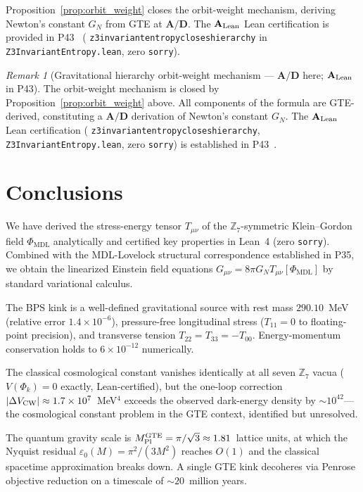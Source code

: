 \documentclass[11pt]{article}
\theoremstyle{remark}
\newtheorem{remark}[theorem]{Remark}
\newcommand{\GTE}{\text{GTE}}
\newcommand{\PHIMDL}{\Phi_{\mathrm{MDL}}}
\newcommand{\ZS}{\mathbb{Z}_7}
\newcommand{\lean}[1]{%
  \penalty-100
  \begingroup\def\_{\textunderscore\allowbreak}\texttt{#1}\endgroup}
\newcommand{\epsz}{\varepsilon_0}
\newcommand{\CatAL}{\ensuremath{\textbf{A}_{\rm Lean}}}
\newcommand{\CatAD}{\textbf{A/D}}
\newcommand{\Tmunu}{T_{\mu\nu}}
\newcommand{\GN}{G_N}
\newcommand{\MPltot}{M_{\rm Pl}^{\GTE}}
\begin{document}
\noindent
Proposition~\ref{prop:orbit_weight} closes the orbit-weight mechanism,
deriving Newton's constant $\GN$ from GTE at $\CatAD$.
The $\CatAL$ Lean certification is provided in P43~\cite{SpivackCompleteness}
(\lean{z3\_invariant\_entropy\_closes\_hierarchy} in \lean{Z3InvariantEntropy.lean},
zero \texttt{sorry}).

\begin{remark}[Gravitational hierarchy orbit-weight mechanism — $\CatAD$ here; $\CatAL$ in P43]
\label{op:hierarchy}
The orbit-weight mechanism is closed by Proposition~\ref{prop:orbit_weight} above.
All components of the formula are GTE-derived, constituting a $\CatAD$ derivation
of Newton's constant $\GN$.  The $\CatAL$ Lean certification
(\lean{z3\_invariant\_entropy\_closes\_hierarchy}, \lean{Z3InvariantEntropy.lean},
zero \texttt{sorry}) is established in P43~\cite{SpivackCompleteness}.
\end{remark}

\section{Conclusions}
\label{sec:conclusions}

We have derived the stress-energy tensor $\Tmunu$ of the $\ZS$-symmetric
Klein--Gordon field $\PHIMDL$ analytically and certified key properties in
Lean~4 (zero \texttt{sorry}).
Combined with the MDL-Lovelock structural correspondence established in P35,
we obtain the linearized Einstein field equations
$G_{\mu\nu} = 8\pi\GN\Tmunu[\PHIMDL]$ by standard variational calculus.

The BPS kink is a well-defined gravitational source with rest mass $290.10$~MeV
(relative error $1.4\times10^{-6}$), pressure-free longitudinal stress ($T_{11}=0$
to floating-point precision), and transverse tension $T_{22}=T_{33}=-T_{00}$.
Energy-momentum conservation holds to $6\times10^{-12}$ numerically.

The classical cosmological constant vanishes identically at all seven $\ZS$ vacua
($V(\Phi_k) = 0$ exactly, Lean-certified), but the one-loop correction
$|\Delta V_{\rm CW}| \approx 1.7\times10^{7}$~MeV$^4$ exceeds the observed
dark-energy density by $\sim10^{42}$---the cosmological constant problem in the
GTE context, identified but unresolved.

The quantum gravity scale is $\MPltot = \pi/\sqrt{3} \approx 1.81$~lattice units,
at which the Nyquist residual $\epsz(M) = \pi^2/(3M^2)$ reaches $O(1)$ and the
classical spacetime approximation breaks down.
A single GTE kink decoheres via Penrose objective reduction on a timescale of
$\sim20$~million years.
\end{document}

